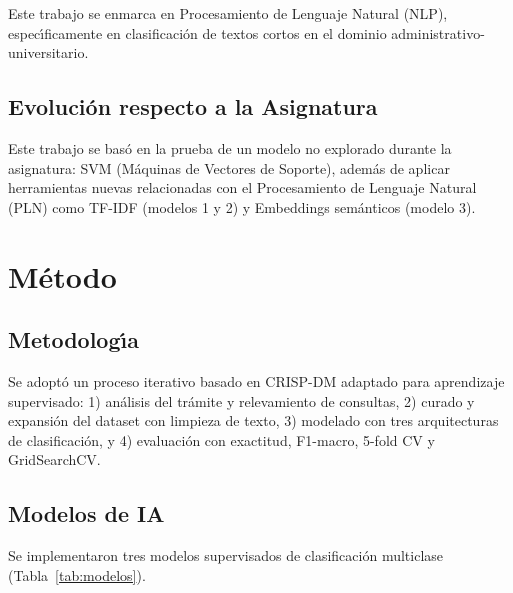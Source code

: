 \documentclass[conference, a4paper]{IEEEtran}
\begin{document}
Este trabajo se enmarca en Procesamiento de Lenguaje Natural (NLP), 
espec\'{\i}ficamente en clasificaci\'on de textos cortos en el dominio 
administrativo-universitario.

\subsection{Evoluci\'on respecto a la Asignatura}

Este trabajo se bas\'o en la prueba de un modelo no explorado durante 
la asignatura: SVM (M\'aquinas de Vectores de Soporte), adem\'as de 
aplicar herramientas nuevas relacionadas con el Procesamiento de 
Lenguaje Natural (PLN) como TF-IDF (modelos 1 y 2) y Embeddings 
sem\'anticos (modelo 3).

\section{M\'etodo}

\subsection{Metodolog\'{\i}a}

Se adopt\'o un proceso iterativo basado en CRISP-DM adaptado para 
aprendizaje supervisado: 1) an\'alisis del tr\'amite y relevamiento de 
consultas, 2) curado y expansi\'on del dataset con limpieza de texto, 
3) modelado con tres arquitecturas de clasificaci\'on, y 4) evaluaci\'on 
con exactitud, F1-macro, 5-fold CV y GridSearchCV.

\subsection{Modelos de IA}

Se implementaron tres modelos supervisados de clasificaci\'on multiclase 
(Tabla~\ref{tab:modelos}).

\begin{table}[h!]
\centering
\caption{Arquitecturas de los modelos implementados.}
\label{tab:modelos}
\end{table}
\end{document}

